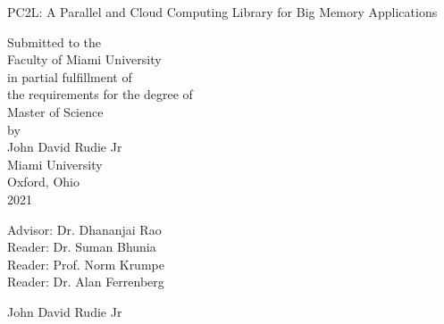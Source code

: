 \documentclass[12pt, oneside]{book2}
\begin{document}
\begin{titlepage}
\begin{center}
PC2L: A Parallel and Cloud Computing Library for Big Memory Applications

\vspace{1.5cm}


\vspace{0.5cm}

Submitted to the \\
Faculty of Miami University \\
in partial fulfillment of \\
the requirements for the degree of \\
Master of Science \\
by \\
John David Rudie Jr \\
Miami University \\
Oxford, Ohio \\
2021

\vspace{1.5cm}

Advisor: Dr. Dhananjai Rao\\
Reader: Dr. Suman Bhunia \\
Reader: Prof. Norm Krumpe\\
Reader: Dr. Alan Ferrenberg\\


\vspace{1.5cm}

 John David Rudie Jr

\end{center}

\end{titlepage}




\singlespacing
\setcounter{page}{3}
\tableofcontents
\setcounter{tocdepth}{2}
\cleardoublepage
{}
\listoftables
\cleardoublepage
{}
\listoffigures

\newpage


\mainmatter








\backmatter



\end{document}
